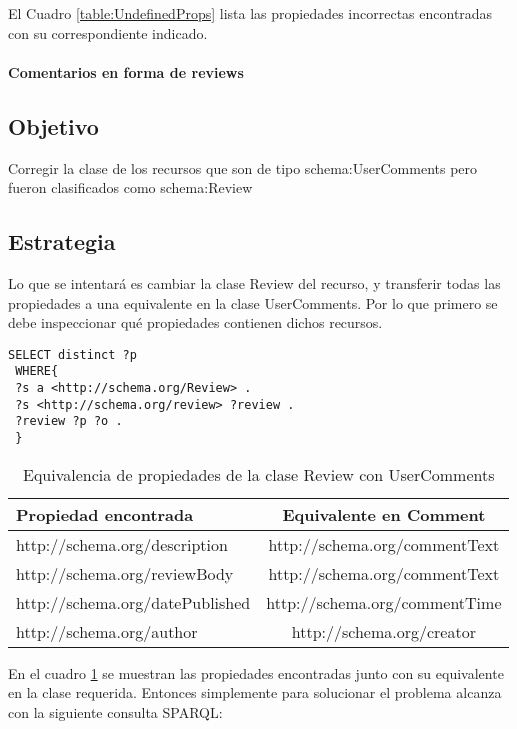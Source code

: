 El Cuadro \ref{table:UndefinedProps} lista las propiedades incorrectas encontradas con su correspondiente indicado.
\\\\
\textbf{Comentarios en forma de reviews}\\
\subsection*{Objetivo}
Corregir la clase de los recursos que son de tipo schema:UserComments pero fueron clasificados como schema:Review

\subsection*{Estrategia}
Lo que se intentará es cambiar la clase Review del recurso, y transferir todas las propiedades a una equivalente en la clase UserComments.
Por lo que primero se debe inspeccionar qué propiedades contienen dichos recursos.

\begin{lstlisting}[frame=single]
 SELECT distinct ?p
 WHERE{
 ?s a <http://schema.org/Review> .
 ?s <http://schema.org/review> ?review .
 ?review ?p ?o .
 }
\end{lstlisting}

\begin{table}[h]
\begin{tabular}{| l | c |} \hline
Propiedad encontrada & Equivalente en Comment\\\hline
http://schema.org/description & http://schema.org/commentText \\
http://schema.org/reviewBody & http://schema.org/commentText \\
http://schema.org/datePublished & http://schema.org/commentTime \\
http://schema.org/author & http://schema.org/creator \\\hline
\end{tabular}
\caption{Equivalencia de propiedades de la clase Review con UserComments}
\label{table:PropertyEqRevCom}
\end{table}

En el cuadro \ref{table:PropertyEqRevCom} se muestran las propiedades encontradas junto con su equivalente en la clase requerida. 
Entonces simplemente para solucionar el problema alcanza con la siguiente consulta SPARQL:

